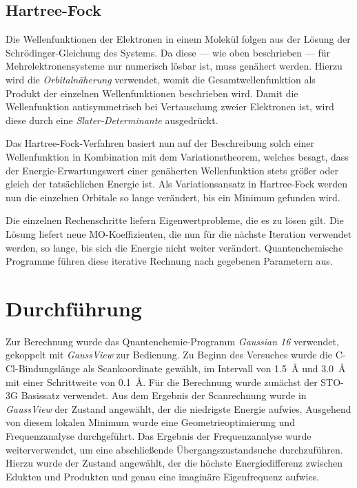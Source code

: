 \subsection{Hartree-Fock}

Die Wellenfunktionen der Elektronen in einem Molekül folgen aus der Lösung der Schrödinger-Gleichung des Systems.
Da diese --- wie oben beschrieben --- für Mehrelektronensysteme nur numerisch lösbar ist, muss genähert werden.
Hierzu wird die \textit{Orbitalnäherung} verwendet, womit die Gesamtwellenfunktion als Produkt der einzelnen Wellenfunktionen beschrieben wird.
Damit die Wellenfunktion antisymmetrisch bei Vertauschung zweier Elektronen ist, wird diese durch eine \textit{Slater-Determinante} ausgedrückt.

Das Hartree-Fock-Verfahren basiert nun auf der Beschreibung solch einer Wellenfunktion in Kombination mit dem Variationstheorem, welches besagt, dass der Energie-Erwartungswert einer genäherten Wellenfunktion stets größer oder gleich der tatsächlichen Energie ist.
Als Variationsansatz in Hartree-Fock werden nun die einzelnen Orbitale so lange verändert, bis ein Minimum gefunden wird.

Die einzelnen Rechenschritte liefern Eigenwertprobleme, die es zu lösen gilt.
Die Lösung liefert neue MO-Koeffizienten, die nun für die nächste Iteration verwendet werden, so lange, bis sich die Energie nicht weiter verändert.
Quantenchemische Programme führen diese iterative Rechnung nach gegebenen Parametern aus.

\section{Durchführung}

Zur Berechnung wurde das Quantenchemie-Programm \textit{Gaussian 16}\autocite{g16} verwendet, gekoppelt mit \textit{GaussView}\autocite{gv6} zur Bedienung.
Zu Beginn des Versuches wurde die C-Cl-Bindungslänge als Scankoordinate gewählt, im Intervall von \qty{1.5}{\angstrom} und \qty{3.0}{\angstrom} mit einer Schrittweite von \qty{0.1}{\angstrom}.
Für die Berechnung wurde zunächst der STO-3G Basissatz verwendet.
Aus dem Ergebnis der Scanrechnung wurde in \textit{GaussView} der Zustand angewählt, der die niedrigste Energie aufwies.
Ausgehend von diesem lokalen Minimum wurde eine Geometrieoptimierung und Frequenzanalyse durchgeführt.
Das Ergebnis der Frequenzanalyse wurde weiterverwendet, um eine abschließende Übergangszustandsuche durchzuführen.
Hierzu wurde der Zustand angewählt, der die höchste Energiedifferenz zwischen Edukten und Produkten und genau eine imaginäre Eigenfrequenz aufwies.

